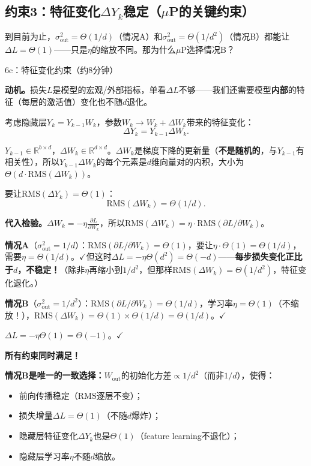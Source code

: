 \documentclass[11pt,a4paper]{article}
\newcommand{\R}{\mathbb{R}}
\begin{document}
\subsection{约束3：特征变化$\Delta Y_k$稳定（$\mu$P的关键约束）}

到目前为止，$\sigma_{\text{out}}^2=\Theta(1/d)$（情况A）和$\sigma_{\text{out}}^2=\Theta(1/d^2)$（情况B）都能让$\Delta L=\Theta(1)$——只是$\eta$的缩放不同。那为什么$\mu$P选择情况B？

\begin{handcalc}{6c：特征变化约束（约8分钟）}

\textbf{动机。}损失$L$是模型的宏观/外部指标，单看$\Delta L$不够——我们还需要模型\textbf{内部}的特征（每层的激活值）变化也不随$d$退化。

考虑隐藏层$Y_k = Y_{k-1}W_k$，参数$W_k\to W_k+\Delta W_k$带来的特征变化：
\[
\Delta Y_k = Y_{k-1}\Delta W_k.
\]

$Y_{k-1}\in\R^{b\times d}$，$\Delta W_k\in\R^{d\times d}$。$\Delta W_k$是梯度下降的更新量（\textbf{不是随机的}，与$Y_{k-1}$有相关性），所以$Y_{k-1}\Delta W_k$的每个元素是$d$维向量对的内积，大小为$\Theta(d\cdot\text{RMS}(\Delta W_k))$。

\tcblower

要让$\text{RMS}(\Delta Y_k)=\Theta(1)$：
\[
\boxed{\text{RMS}(\Delta W_k) = \Theta(1/d).}
\]

\textbf{代入检验。}$\Delta W_k = -\eta\frac{\partial L}{\partial W_k}$，所以$\text{RMS}(\Delta W_k)=\eta\cdot\text{RMS}(\partial L/\partial W_k)$。

\textbf{情况A}（$\sigma_{\text{out}}^2=1/d$）：$\text{RMS}(\partial L/\partial W_k)=\Theta(1)$，要让$\eta\cdot\Theta(1)=\Theta(1/d)$，需要$\eta=\Theta(1/d)$。$\checkmark$但这时$\Delta L = -\eta\Theta(d^2) = \Theta(-d)$——\textbf{每步损失变化正比于$d$，不稳定！}（除非$\eta$再缩小到$1/d^2$，但那样$\text{RMS}(\Delta W_k)=\Theta(1/d^2)$，特征变化退化。）

\textbf{情况B}（$\sigma_{\text{out}}^2=1/d^2$）：$\text{RMS}(\partial L/\partial W_k)=\Theta(1/d)$，学习率$\eta=\Theta(1)$（不缩放！），$\text{RMS}(\Delta W_k)=\Theta(1)\times\Theta(1/d)=\Theta(1/d)$。$\checkmark$

$\Delta L = -\eta\Theta(1) = \Theta(-1)$。$\checkmark$

\textbf{所有约束同时满足！}

\medskip
\begin{tcolorbox}[colback=red!5,colframe=red!60!black,title=\textbf{$\mu$P的推导结论}]
\textbf{情况B是唯一的一致选择：}$W_{\text{out}}$的初始化方差$\propto 1/d^2$（而非$1/d$），使得：
\begin{itemize}[leftmargin=*]
\item 前向传播稳定（$\text{RMS}$逐层不变）；
\item 损失增量$\Delta L=\Theta(1)$（不随$d$爆炸）；
\item 隐藏层特征变化$\Delta Y_k$也是$\Theta(1)$（feature learning不退化）；
\item 隐藏层学习率$\eta$不随$d$缩放。
\end{itemize}


\end{tcolorbox}
\end{handcalc}
\end{document}
